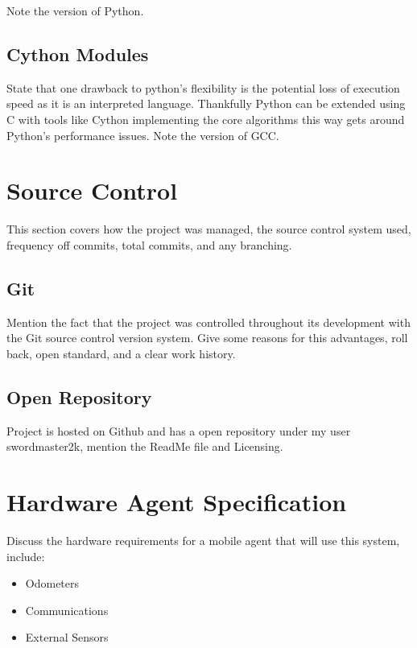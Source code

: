 Note the version of Python.

\subsection{Cython Modules}
State that one drawback to python's flexibility is the potential loss of execution speed as it is an interpreted language. Thankfully Python can be extended using C with tools like Cython implementing the core algorithms this way gets around Python's performance issues. Note the version of GCC.

\newpage


\section{Source Control}
This section covers how the project was managed, the source control system used, frequency off commits, total commits, and any branching.

\subsection{Git}
Mention the fact that the project was controlled throughout its development with the Git source control version system. Give some reasons for this advantages, roll back, open standard, and a clear work history.

\subsection{Open Repository}
Project is hosted on Github and has a open repository under my user swordmaster2k, mention the ReadMe file and Licensing.


\section{Hardware Agent Specification}
Discuss the hardware requirements for a mobile agent that will use this system, include:

\begin{itemize}
\item Odometers
\item Communications
\item External Sensors
\end{itemize}

